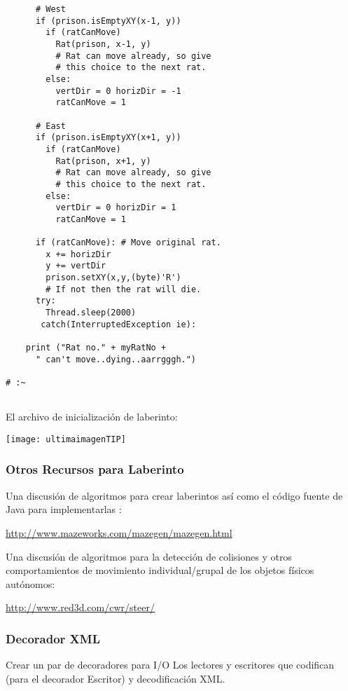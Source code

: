 \begin{lstlisting}
      # West 
      if (prison.isEmptyXY(x-1, y)) 
        if (ratCanMove) 
          Rat(prison, x-1, y)    
          # Rat can move already, so give  
          # this choice to the next rat. 
        else: 
          vertDir = 0 horizDir = -1          
          ratCanMove = 1 
          
      # East 
      if (prison.isEmptyXY(x+1, y)) 
        if (ratCanMove) 
          Rat(prison, x+1, y)    
          # Rat can move already, so give  
          # this choice to the next rat. 
        else: 
          vertDir = 0 horizDir = 1          
          ratCanMove = 1 
          
      if (ratCanMove): # Move original rat. 
        x += horizDir 
        y += vertDir 
        prison.setXY(x,y,(byte)'R') 
        # If not then the rat will die. 
      try: 
        Thread.sleep(2000)    
       catch(InterruptedException ie): 
       
    print ("Rat no." + myRatNo +  
      " can't move..dying..aarrgggh.") 
      
# :~     
    
\end{lstlisting}

El archivo de inicialización de laberinto:

\texttt{[image: ultimaimagenTIP]}


\subsubsection*{Otros Recursos para Laberinto}
\label{subsubsec:orpl}


Una discusión de algoritmos para crear laberintos así como el código fuente de Java para implementarlas : \newline

\textcolor[rgb]{0.2,0.5,0.7}{\underline{http://www.mazeworks.com/mazegen/mazegen.html}} \newline      %

Una discusión de algoritmos para la detección de colisiones y otros comportamientos de movimiento individual/grupal de los objetos físicos autónomos: \newline

\textcolor[rgb]{0.2,0.5,0.7}{\underline{http://www.red3d.com/cwr/steer/}}


\subsubsection*{Decorador XML}
\label{subsubsec:dxml}


Crear un par de decoradores para I/O Los lectores y escritores que codifican (para el decorador Escritor) y decodificación XML.
